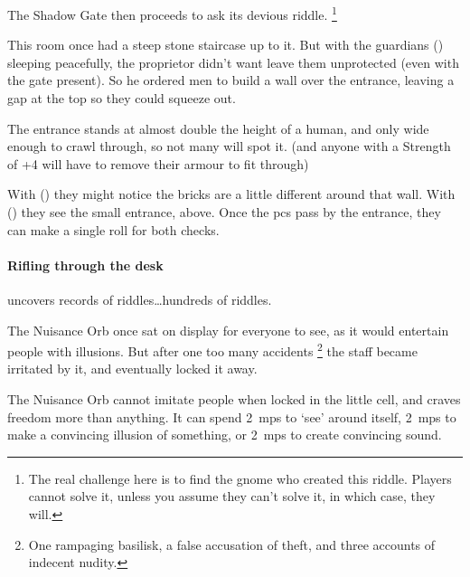 \begin{multicols}{2}
\showStdSpells[
  \setcounter{diceNo}{0}
]

The Shadow Gate then proceeds to ask its devious riddle.%
\footnote{The real challenge here is to find the gnome who created this riddle. Players cannot solve it, unless you assume they can't solve it, in which case, they will.}

\hardestRiddleEver


\begin{exampletext}
  This room once had a steep stone staircase up to it.
  But with the guardians () sleeping peacefully, the proprietor didn't want leave them unprotected (even with the gate present).
  So he ordered men to build a wall over the entrance, leaving a gap at the top so they could squeeze out.
\end{exampletext}

The entrance stands at almost double the height of a human, and only wide enough to crawl through, so not many will spot it.
(and anyone with a Strength of +4 will have to remove their armour to fit through)

With  (\tn[14]) they might notice the bricks are a little different around that wall.
With  (\tn[12]) they see the small entrance, above.
Once the \glspl{pc} pass by the entrance, they can make a single roll for both checks.

\paragraph{Rifling through the desk}
uncovers records of riddles\ldots hundreds of riddles.


\begin{exampletext}
  The Nuisance Orb once sat on display for everyone to see, as it would entertain people with illusions.
  But after one too many accidents%
  \footnote{One rampaging \gls{basilisk}, a false accusation of theft, and three accounts of indecent nudity.}
  the staff became irritated by it, and eventually locked it away.
\end{exampletext}

The Nuisance Orb cannot imitate people when locked in the little cell, and craves freedom more than anything.
It can spend 2~\glspl{mp} to `see' around itself, 2~\glspl{mp} to make a convincing illusion of something, or 2~\glspl{mp} to create convincing sound.


\end{multicols}
